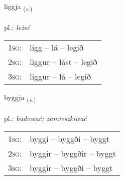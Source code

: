 \documentclass[frontgrid, backgrid]{flacards}\usepackage[]{graphicx}\usepackage[]{xcolor}
\begin{document}
{liggja \small{\textsubscript{(\textit{v.})}} \\[1ex] %
\textphonetic{[lɪca]} \\
pl.: \emph{leżeć} \\  [2ex]
\renewcommand*{\arraystretch}{0.8}
\begin{tabular}{p{1cm}l}
\textsc{1sg}: & ligg -- lá -- legið \\ 
\textsc{2sg}: & liggur -- lást -- legið \\ 
\textsc{3sg}: & liggur -- lá -- legið \\ 
\end{tabular}
}

\renewcommand{\flhead}{\vskip5pt \fboxsep=0pt {\small\bfseries\footnotesize Sagnorð | czasownik}}
\renewcommand{\fcfoot}{\vskip5pt \fboxsep=0pt \hspace{2pt}{\small\bfseries\footnotesize 1K}}

\renewcommand{\blhead}{\vskip5pt {\small\bfseries\footnotesize Sagnorð | czasownik }}
\renewcommand{\bcfoot}{\vskip5pt \hspace{2pt}{\small\bfseries\footnotesize 1K}}


{byggja \small{\textsubscript{(\textit{v.})}} \\[1ex] %
\textphonetic{[pɪca]} \\
pl.: \emph{budować; zamieszkiwać} \\  [2ex]
\renewcommand*{\arraystretch}{0.8}
\begin{tabular}{p{1cm}l}
\textsc{1sg}: & byggi -- byggði -- byggt \\ 
\textsc{2sg}: & byggir -- byggðir -- byggt \\ 
\textsc{3sg}: & byggir -- byggði -- byggt \\ 
\end{tabular}
}

\renewcommand{\flhead}{\vskip5pt \fboxsep=0pt {\small\bfseries\footnotesize Nafnorð | rzeczownik}}
\renewcommand{\fcfoot}{\vskip5pt \fboxsep=0pt \hspace{2pt}{\small\bfseries\footnotesize 1K}}
\end{document}
